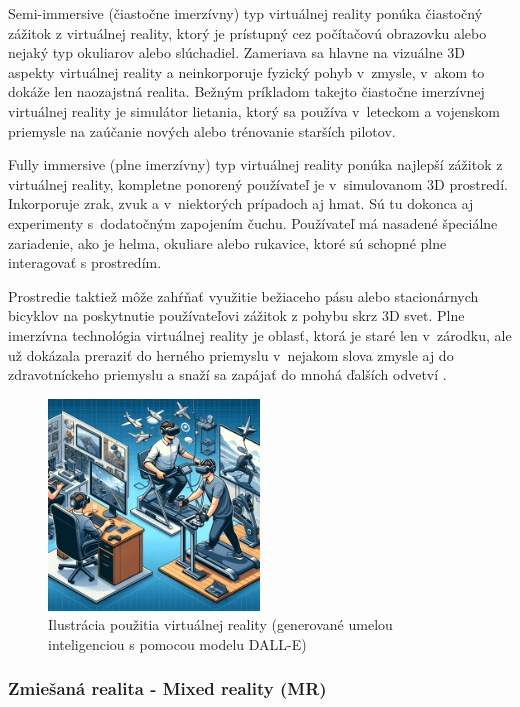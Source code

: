 Semi-immersive (čiastočne imerzívny) typ virtuálnej reality ponúka čiastočný zážitok z virtuálnej reality, ktorý je prístupný cez počítačovú obrazovku alebo nejaký typ okuliarov alebo slúchadiel. Zameriava sa hlavne na vizuálne 3D aspekty virtuálnej reality a neinkorporuje fyzický pohyb v~zmysle, v~akom to dokáže len naozajstná realita. Bežným príkladom takejto čiastočne imerzívnej virtuálnej reality je simulátor lietania, ktorý sa používa v~leteckom a vojenskom priemysle na zaúčanie nových alebo trénovanie starších pilotov. 

Fully immersive (plne imerzívny) typ virtuálnej reality ponúka najlepší zážitok z virtuálnej reality, kompletne ponorený používateľ je v~simulovanom 3D prostredí. Inkorporuje zrak, zvuk a v~niektorých prípadoch aj hmat. Sú tu dokonca aj experimenty s~dodatočným zapojením čuchu. Používateľ má nasadené špeciálne zariadenie, ako je helma, okuliare alebo rukavice, ktoré sú schopné plne interagovať s prostredím.

Prostredie taktiež môže zahŕňať využitie bežiaceho pásu alebo stacionárnych bicyklov na poskytnutie používateľovi zážitok z pohybu skrz 3D svet. Plne imerzívna technológia virtuálnej reality je oblasť, ktorá je staré len v~zárodku, ale už dokázala preraziť do herného priemyslu v~nejakom slova zmysle aj do zdravotníckeho priemyslu a snaží sa zapájať do mnohá ďalších odvetví \cite{sheldon2022vr}.%

\begin{figure}[h]
  \centering
  \includegraphics[width=0.5\textwidth]{img/virtualna_realita.png}
  \caption{Ilustrácia použitia virtuálnej reality (generované umelou inteligenciou s pomocou modelu DALL-E)}
  \label{fig:vir_real}
\end{figure}

\subsubsection{Zmiešaná realita - Mixed reality (MR)}

